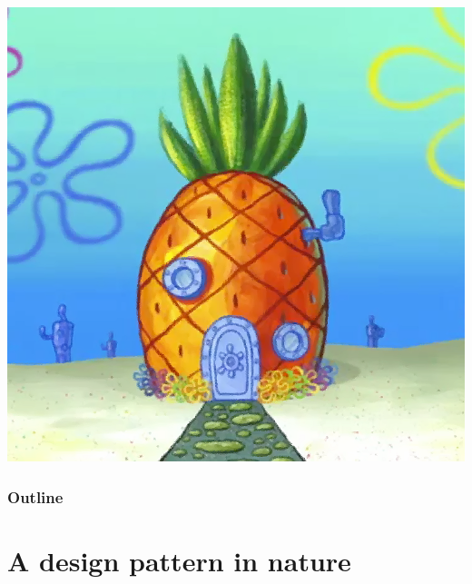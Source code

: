 \documentclass[12pt,compress,english,utf8,t]{beamer}
\begin{document}
{\begin{center}
    \includegraphics[height=0.25\textheight]{spongebob-ananas}
  \end{center}
}

\begin{frame}\frametitle{Outline}\tableofcontents\end{frame}



\section{A design pattern in nature}
\end{document}
